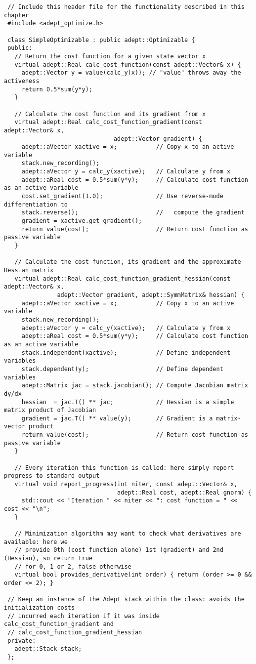 \documentclass[a4,oneside]{book}
\begin{document}
\begin{lstlisting}
 // Include this header file for the functionality described in this chapter
 #include <adept_optimize.h>

 class SimpleOptimizable : public adept::Optimizable {
 public:
   // Return the cost function for a given state vector x
   virtual adept::Real calc_cost_function(const adept::Vector& x) {
     adept::Vector y = value(calc_y(x)); // "value" throws away the activeness
     return 0.5*sum(y*y);
   }

   // Calculate the cost function and its gradient from x
   virtual adept::Real calc_cost_function_gradient(const adept::Vector& x,
					           adept::Vector gradient) {
     adept::aVector xactive = x;           // Copy x to an active variable
     stack.new_recording();
     adept::aVector y = calc_y(xactive);   // Calculate y from x
     adept::aReal cost = 0.5*sum(y*y);     // Calculate cost function as an active variable
     cost.set_gradient(1.0);               // Use reverse-mode differentiation to
     stack.reverse();                      //   compute the gradient
     gradient = xactive.get_gradient();
     return value(cost);                   // Return cost function as passive variable
   }

   // Calculate the cost function, its gradient and the approximate Hessian matrix
   virtual adept::Real calc_cost_function_gradient_hessian(const adept::Vector& x,
			   adept::Vector gradient, adept::SymmMatrix& hessian) {
     adept::aVector xactive = x;           // Copy x to an active variable
     stack.new_recording();
     adept::aVector y = calc_y(xactive);   // Calculate y from x
     adept::aReal cost = 0.5*sum(y*y);     // Calculate cost function as an active variable
     stack.independent(xactive);           // Define independent variables
     stack.dependent(y);                   // Define dependent variables
     adept::Matrix jac = stack.jacobian(); // Compute Jacobian matrix dy/dx
     hessian  = jac.T() ** jac;            // Hessian is a simple matrix product of Jacobian
     gradient = jac.T() ** value(y);       // Gradient is a matrix-vector product
     return value(cost);                   // Return cost function as passive variable
   }

   // Every iteration this function is called: here simply report progress to standard output
   virtual void report_progress(int niter, const adept::Vector& x,
                                adept::Real cost, adept::Real gnorm) {
     std::cout << "Iteration " << niter << ": cost function = " << cost << "\n";
   }
 
   // Minimization algorithm may want to check what derivatives are available: here we 
   // provide 0th (cost function alone) 1st (gradient) and 2nd (Hessian), so return true
   // for 0, 1 or 2, false otherwise
   virtual bool provides_derivative(int order) { return (order >= 0 && order <= 2); }

 // Keep an instance of the Adept stack within the class: avoids the initialization costs
 // incurred each iteration if it was inside calc_cost_function_gradient and
 // calc_cost_function_gradient_hessian 
 private:
   adept::Stack stack;
 };
\end{lstlisting}
\end{document}
